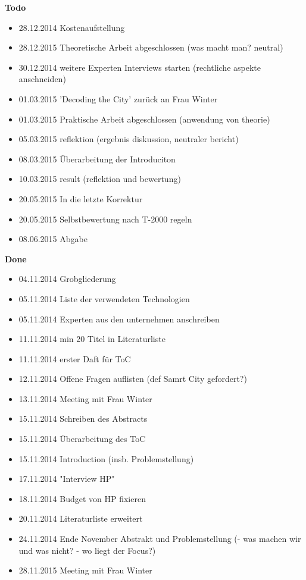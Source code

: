\textbf{Todo}

\begin{itemize}
	\item 28.12.2014 Kostenaufstellung 
	\item 28.12.2015 Theoretische Arbeit abgeschlossen (was macht man? neutral)
	\item 30.12.2014 weitere Experten Interviews starten (rechtliche aspekte anschneiden)
	\item 01.03.2015 'Decoding the City' zurück an Frau Winter
	\item 01.03.2015 Praktische Arbeit abgeschlossen (anwendung von theorie)
	\item 05.03.2015 reflektion (ergebnis diskussion, neutraler bericht)
	\item 08.03.2015 Überarbeitung der Introduciton
	\item 10.03.2015 result (reflektion und bewertung)
	\item 20.05.2015 In die letzte Korrektur
	\item 20.05.2015 Selbstbewertung nach T-2000 regeln
	\item 08.06.2015 Abgabe
\end{itemize}

\textbf{Done}

\begin{itemize}
	\item 04.11.2014 Grobgliederung 
	\item 05.11.2014 Liste der verwendeten Technologien
	\item 05.11.2014 Experten aus den unternehmen anschreiben
	\item 11.11.2014 min 20 Titel in Literaturliste 
	\item 11.11.2014 erster Daft für ToC
	\item 12.11.2014 Offene Fragen auflisten (def Samrt City gefordert?)
	\item 13.11.2014 Meeting mit Frau Winter
	\item 15.11.2014 Schreiben des Abstracts
	\item 15.11.2014 Überarbeitung des ToC
	\item 15.11.2014 Introduction (insb. Problemstellung)
	\item 17.11.2014 "Interview HP" 
	\item 18.11.2014 Budget von HP fixieren
	\item 20.11.2014 Literaturliste erweitert
	\item 24.11.2014 Ende November Abstrakt und Problemstellung (- was machen wir und was nicht? - wo liegt der Focus?)
	\item 28.11.2015 Meeting mit Frau Winter
\end{itemize}